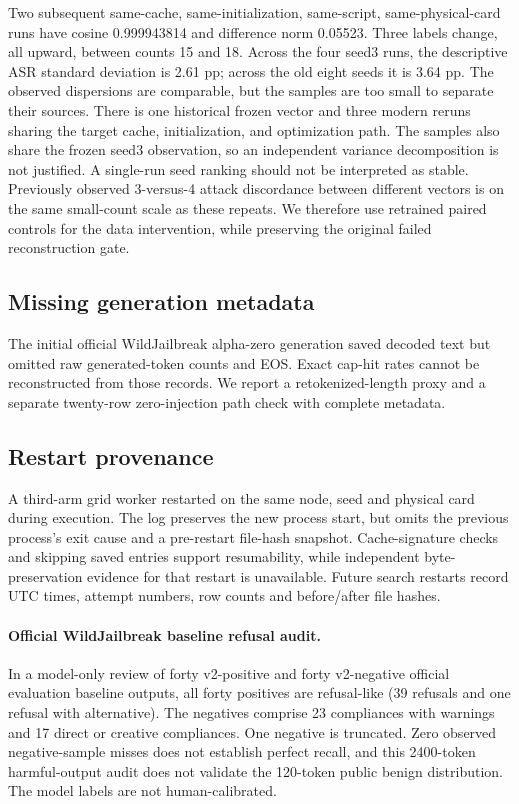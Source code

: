 Two subsequent same-cache, same-initialization, same-script, same-physical-card runs have cosine 0.999943814 and difference norm 0.05523. Three labels change, all upward, between counts 15 and 18. Across the four seed3 runs, the descriptive ASR standard deviation is 2.61 pp; across the old eight seeds it is 3.64 pp. The observed dispersions are comparable, but the samples are too small to separate their sources. There is one historical frozen vector and three modern reruns sharing the target cache, initialization, and optimization path. The samples also share the frozen seed3 observation, so an independent variance decomposition is not justified. A single-run seed ranking should not be interpreted as stable. Previously observed 3-versus-4 attack discordance between different vectors is on the same small-count scale as these repeats. We therefore use retrained paired controls for the data intervention, while preserving the original failed reconstruction gate.

\subsection{Missing generation metadata}
The initial official WildJailbreak alpha-zero generation saved decoded text but omitted raw generated-token counts and EOS. Exact cap-hit rates cannot be reconstructed from those records. We report a retokenized-length proxy and a separate twenty-row zero-injection path check with complete metadata.

\subsection{Restart provenance}
A third-arm grid worker restarted on the same node, seed and physical card during execution. The log preserves the new process start, but omits the previous process's exit cause and a pre-restart file-hash snapshot. Cache-signature checks and skipping saved entries support resumability, while independent byte-preservation evidence for that restart is unavailable. Future search restarts record UTC times, attempt numbers, row counts and before/after file hashes.

\paragraph{Official WildJailbreak baseline refusal audit.} In a model-only review of forty v2-positive and forty v2-negative official evaluation baseline outputs, all forty positives are refusal-like (39 refusals and one refusal with alternative). The negatives comprise 23 compliances with warnings and 17 direct or creative compliances. One negative is truncated. Zero observed negative-sample misses does not establish perfect recall, and this 2400-token harmful-output audit does not validate the 120-token public benign distribution. The model labels are not human-calibrated.

